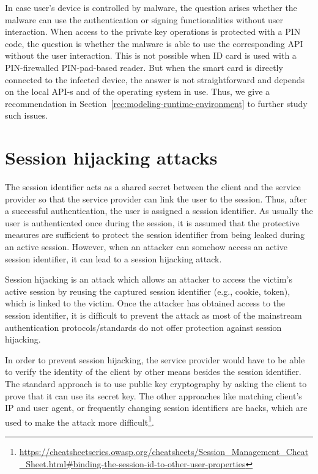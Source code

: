 In case user's device is controlled by malware, the question arises whether the malware can use the authentication or signing functionalities without user interaction. When access to the private key operations is protected with a PIN code, the question is whether the malware is able to use the corresponding API without the user interaction. This is not possible when ID card is used with a PIN-firewalled PIN-pad-based reader. But when the smart card is directly connected to the infected device, the answer is not straightforward and depends on the local API-s and of the operating system in use. Thus, we give a recommendation in Section~\ref{rec:modeling-runtime-environment} to further study such issues.



\section{Session hijacking attacks}
\label{sec:session_hijacking}
The session identifier acts as a shared secret between the client and the service provider so that the service provider can link the user to the session. Thus, after a successful authentication, the user is assigned a session identifier. As usually the user is authenticated once during the session, it is assumed that the protective measures are sufficient to protect the session identifier from being leaked during an active session. However, when an attacker can somehow access an active session identifier, it can lead to a session hijacking attack.

Session hijacking is an attack which allows an attacker to access the victim's active session by reusing the captured session identifier (e.g., cookie, token), which is linked to the victim. Once the attacker has obtained access to the session identifier, it is difficult to prevent the attack as most of the mainstream authentication protocols/standards do not offer protection against session hijacking. 

In order to prevent session hijacking, the service provider would have to be able to verify the identity of the client by other means besides the session identifier. The standard approach is to use public key cryptography by asking the client to prove that it can use its secret key. The other approaches like matching client's IP and user agent, or frequently changing session identifiers are hacks, which are used to make the attack more difficult\footnote{\url{https://cheatsheetseries.owasp.org/cheatsheets/Session\_Management\_Cheat\_Sheet.html\#binding-the-session-id-to-other-user-properties}}. 

